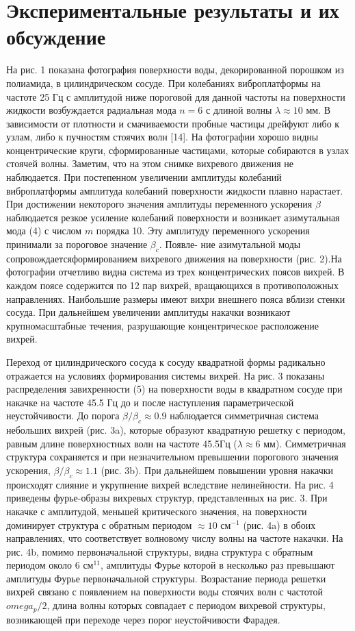 \section{Экспериментальные результаты и их обсуждение} \label{sect3_3} На рис. 1 показана фотография поверхности воды, декорированной порошком из полиамида, в цилиндрическом сосуде. При колебаниях виброплатформы на частоте 25 Гц с амплитудой ниже пороговой для данной частоты на поверхности жидкости возбуждается радиальная мода $n = 6$ с длиной волны $\lambda \approx 10$ мм. В зависимости от плотности и смачиваемости пробные частицы дрейфуют либо к узлам, либо к пучностям стоячих волн [14]. На фотографии хорошо видны концентрические круги, сформированные частицами, которые собираются в узлах стоячей волны. Заметим, что на этом снимке вихревого движения не наблюдается. При постепенном увеличении амплитуды колебаний виброплатформы амплитуда колебаний поверхности жидкости плавно нарастает. При достижении некоторого значения амплитуды переменного ускорения $\beta$ наблюдается резкое усиление колебаний поверхности и возникает азимутальная мода (4) с числом $m$ порядка 10. Эту амплитуду переменного ускорения принимали за пороговое значение $\beta_c$. Появле- ние азимутальной моды сопровождаетсяформированием вихревого движения на поверхности (рис. 2).На фотографии отчетливо видна система из трех концентрических поясов вихрей. В каждом поясе содержится по 12 пар вихрей, вращающихся в противоположных направлениях. Наибольшие размеры имеют вихри внешнего пояса вблизи стенки сосуда. При дальнейшем увеличении амплитуды накачки возникают крупномасштабные течения, разрушающие концентрическое расположение вихрей.

Переход от цилиндрического сосуда к сосуду квадратной формы радикально отражается на условиях формирования системы вихрей. На рис. 3 показаны распределения завихренности (5) на поверхности воды в квадратном сосуде при накачке на частоте 45.5 Гц до и после наступления параметрической неустойчивости. До порога $\beta/\beta_c \approx 0.9$ наблюдается симметричная система небольших вихрей (рис. 3a), которые образуют квадратную решетку с периодом, равным длине поверхностных волн на частоте 45.5Гц ($\lambda \approx 6$ мм). Симметричная структура сохраняется и при незначительном превышении порогового значения ускорения, $\beta/\beta_c \approx 1.1$ (рис. 3b). При дальнейшем повышении уровня накачки происходят слияние и укрупнение вихрей вследствие нелинейности.
На рис. 4 приведены фурье-образы вихревых структур, представленных на рис. 3. При накачке с амплитудой, меньшей критического значения, на поверхности доминирует структура с обратным периодом $\approx 10$ см$^{-1}$ (рис. 4a) в обоих направлениях, что соответствует волновому числу волны на частоте накачки. На рис. 4b, помимо первоначальной структуры, видна структура с обратным периодом около 6 см$^{11}$, амплитуды Фурье которой в несколько раз превышают амплитуды Фурье первоначальной структуры. Возрастание периода решетки вихрей связано с появлением на поверхности воды стоячих волн с частотой $omega_p/2$, длина волны которых совпадает с периодом вихревой структуры, возникающей при переходе через порог неустойчивости Фарадея. 


